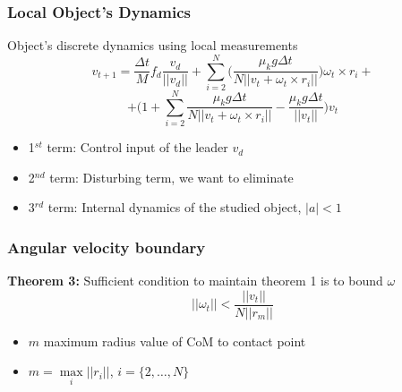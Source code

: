 \documentclass{beamer}
\begin{document}
\begin{frame}
\frametitle{Local Object's Dynamics}
Object's discrete dynamics using local measurements
\begin{equation*}
v_{t+1}= \frac{\Delta t}{M}f_d\frac{v_d}{||v_d||}+\sum_{i=2}^N \bigg(\frac{\mu_k g \Delta t}{N||v_t+\omega_t \times r_i||} \bigg) \omega_t \times r_i+
\end{equation*}
\begin{equation}\label{cblmd}
+\Bigg(1+\sum_{i=2}^N \frac{\mu_k g \Delta t}{N||v_t + \omega_t \times r_i||}-\frac{\mu_k g \Delta t}{||v_t||}\Bigg)v_t
\end{equation}
\begin{itemize}
\item 1$^{st}$ term: Control input of the leader $v_d$
\item 2$^{nd}$ term: Disturbing term, we want to eliminate 
\item 3$^{rd}$ term: Internal dynamics of the studied object,  $|a|<1$
\end{itemize}

\end{frame}


\begin{frame}
\frametitle{Angular velocity boundary}
\textbf{Theorem 3:} Sufficient condition to maintain theorem 1 is to bound $\omega$ 
\begin{equation}
||\omega_t||<\frac{||v_t||}{N||r_m||}
\end{equation}
\begin{itemize}
\item $m$ maximum radius value of CoM to contact point\vspace{.2cm}
\item $m=\max\limits_{i}||r_i||$, $i=\{ 2,\hdots,N \}$
\end{itemize}

\end{frame}

\end{document}
